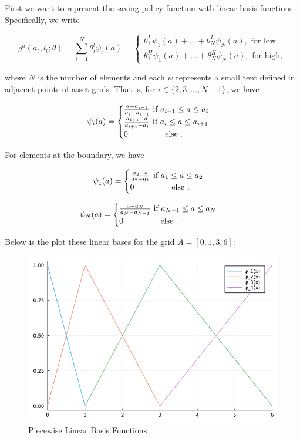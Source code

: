 \documentclass{article}
\begin{document}
	First we want to represent the saving policy function with linear basis functions. Specifically, we write
	
	\[
  		g^{a}(a_{t},l_{t};\theta) = \sum_{i=1}^{N}\theta_{i}^{l}\psi_{i}(a) =
  		\begin{cases}
    		\theta_{1}^{L}\psi_{1}(a) + ... + \theta_{N}^{L} \psi_{N}(a), \text{ for low} \\
    		\theta_{1}^{H}\psi_{1}(a) + ... + \theta_{N}^{H} \psi_{N}(a), \text{ for high},
  		\end{cases}
	\]
	
	where $N$ is the number of elements and each $\psi$ represents a small tent defined in adjacent points of asset grids. That is, for $i \in \{ 2,3,...,N-1 \}$, we have
	
	\[
  		\psi_{i}(a) =
  		\begin{cases}
    		\frac{a - a_{i-1}}{a_{i} - a_{i-1}} \text{ if } a_{i-1} \leq a \leq a_{i} \\
    		\frac{a_{i+1} - a}{a_{i+1} - a_{i}} \text{ if } a_{i} \leq a \leq a_{i+1} \\
    		0 \hspace{1.5 cm} \text{ else }.
  		\end{cases}
	\]
	
	For elements at the boundary, we have
	
	\[
  		\psi_{1}(a) =
  		\begin{cases}
    		\frac{a_{2} - a}{a_{2} - a_{1}} \text{ if } a_{1} \leq a \leq a_{2} \\
    		0 \hspace{1.5 cm} \text{ else },
  		\end{cases}
	\]
	
	\[
  		\psi_{N}(a) =
  		\begin{cases}
    		\frac{a - a_{N}}{a_{N} - a_{N-1}} \text{ if } a_{N-1} \leq a \leq a_{N} \\
    		0 \hspace{1.5 cm} \text{ else }.
  		\end{cases}
	\]
	
	Below is the plot these linear bases for the grid $A = [0,1,3,6]$:
	
	\begin{figure}[htbp]
		\centering
		\includegraphics[scale=0.5]{linear_basis.png}
		\caption{Piecewise Linear Basis Functions}
	\end{figure} 
	
\end{document}
